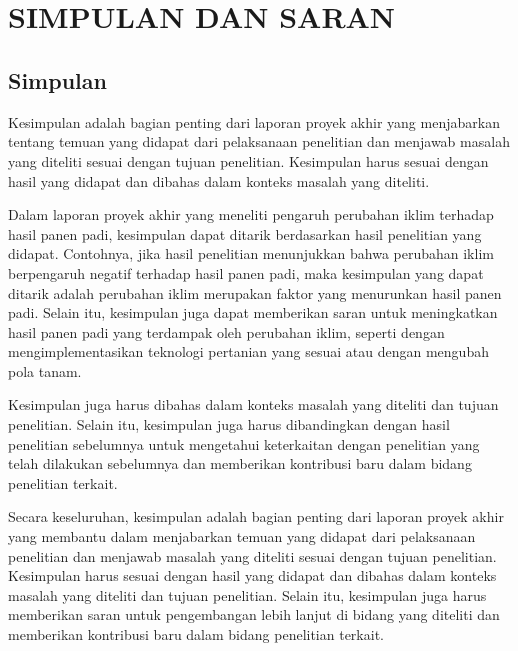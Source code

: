 
\chapter[SIMPULAN DAN SARAN]{\\ SIMPULAN DAN SARAN}

\section{Simpulan}
Kesimpulan adalah bagian penting dari laporan proyek akhir yang menjabarkan tentang temuan yang didapat dari pelaksanaan penelitian dan menjawab masalah yang diteliti sesuai dengan tujuan penelitian. Kesimpulan harus sesuai dengan hasil yang didapat dan dibahas dalam konteks masalah yang diteliti.

Dalam laporan proyek akhir yang meneliti pengaruh perubahan iklim terhadap hasil panen padi, kesimpulan dapat ditarik berdasarkan hasil penelitian yang didapat. Contohnya, jika hasil penelitian menunjukkan bahwa perubahan iklim berpengaruh negatif terhadap hasil panen padi, maka kesimpulan yang dapat ditarik adalah perubahan iklim merupakan faktor yang menurunkan hasil panen padi. Selain itu, kesimpulan juga dapat memberikan saran untuk meningkatkan hasil panen padi yang terdampak oleh perubahan iklim, seperti dengan mengimplementasikan teknologi pertanian yang sesuai atau dengan mengubah pola tanam.

Kesimpulan juga harus dibahas dalam konteks masalah yang diteliti dan tujuan penelitian. Selain itu, kesimpulan juga harus dibandingkan dengan hasil penelitian sebelumnya untuk mengetahui keterkaitan dengan penelitian yang telah dilakukan sebelumnya dan memberikan kontribusi baru dalam bidang penelitian terkait.

Secara keseluruhan, kesimpulan adalah bagian penting dari laporan proyek akhir yang membantu dalam menjabarkan temuan yang didapat dari pelaksanaan penelitian dan menjawab masalah yang diteliti sesuai dengan tujuan penelitian. Kesimpulan harus sesuai dengan hasil yang didapat dan dibahas dalam konteks masalah yang diteliti dan tujuan penelitian. Selain itu, kesimpulan juga harus memberikan saran untuk pengembangan lebih lanjut di bidang yang diteliti dan memberikan kontribusi baru dalam bidang penelitian terkait.

